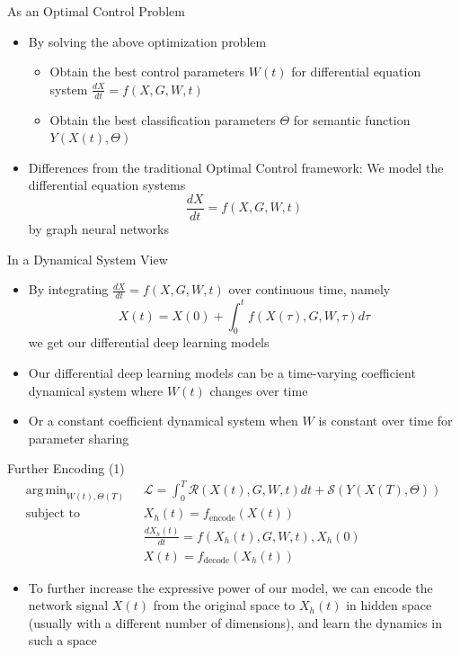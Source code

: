 \documentclass{beamer}
\DeclareMathOperator*{\argmin}{arg\,min}
\begin{document}
\begin{frame}{As an Optimal Control Problem}
\begin{itemize}
\item By solving the above optimization problem
\begin{itemize}
\item Obtain the best control parameters $W(t)$ for differential equation system $\frac{dX}{dt}=f(X,G,W,t)$
\item Obtain the best classification parameters $\Theta$ for semantic function $Y(X(t),\Theta)$
\end{itemize}
\item Differences from the traditional Optimal Control framework: We model the differential equation systems\[
\frac{dX}{dt}=f(X,G,W,t)
\]by graph neural networks
\end{itemize}
\end{frame}

\begin{frame}{In a Dynamical System View}
\begin{itemize}
\item By integrating $\frac{dX}{dt}=f(X,G,W,t)$ over continuous time, namely\[
X(t)=X(0)+\int_0^tf(X(\tau),G,W,\tau)d\tau
\]we get our differential deep learning models
\item Our differential deep learning models can be a time-varying coefficient dynamical system where $W(t)$ changes over time
\item Or a constant coefficient dynamical system when $W$ is constant over time for parameter sharing
\end{itemize}
\end{frame}

\begin{frame}{Further Encoding (1)}
\[
\begin{split}
\argmin_{W(t),\Theta(T)}\text{ }&\mathcal{L}=\int_0^T\mathcal{R}\left(X(t),G,W,t\right)dt+\mathcal{S}\left(Y(X(T),\Theta)\right)\\
\text{subject to }&X_h(t)=f_\text{encode}(X(t))\\
&\frac{dX_h(t)}{dt}=f(X_h(t),G,W,t),X_h(0)\\
&X(t)=f_\text{decode}(X_h(t))
\end{split}
\]
\begin{itemize}
\item To further increase the expressive power of our model, we can encode the network signal $X(t)$ from the original space to $X_h(t)$ in hidden space (usually with a different number of dimensions), and learn the dynamics in such a space
\end{itemize}
\end{frame}
\end{document}

